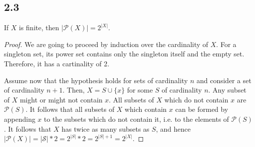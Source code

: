 \subsection*{2.3} If $X$ is finite, then $|\mathcal{P}(X)| = 2^{|X|}$.

\begin{proof}
We are going to proceed by induction over the cardinality of $X$. For a singleton set, its power set contains only the singleton itself and the empty set. Therefore, it has a cartinality of 2.

Assume now that the hypothesis holds for sets of cardinality $n$ and consider a set of cardinality $n+1$. Then, $X = S \cup \{x\}$ for some $S$ of cardinality $n$. Any subset of $X$ might or might not contain $x$. All subsets of $X$ which do not contain $x$ are $\mathcal{P}(S)$. It follows that all subsets of $X$ which contain $x$ can be formed by appending $x$ to the subsets which do not contain it, i.e. to the elements of $\mathcal{P}(S)$. It follows that $X$ has twice as many subsets as $S$, and hence $|\mathcal{P}(X)| = |\mathcal{S}| * 2 = 2^{|S|} * 2 = 2^{|S|+1} = 2^{|X|}$.
\end{proof}


